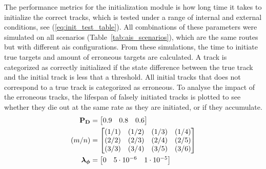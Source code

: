 The performance metrics for the initialization module is how long time it takes to initialize the correct tracks, which is tested under a range of internal and external conditions, see (\ref{eq:init_test_table}). All combinations of these parameters were simulated on all scenarios (Table~\ref{tab:ais_scenarios}), which are the same routes but with different \gls{ais} configurations. 
 From these simulations, the time to initiate true targets and amount of erroneous targets are calculated. A track is categorized as correctly initialized if the state difference between the true track and the initial track is less that a threshold. All initial tracks that does not correspond to a true track is categorized as erroneous. To analyse the impact of the erroneous tracks, the lifespan of falsely initiated tracks is plotted to see whether they die out at the same rate as they are initiated, or if they accumulate.
\begin{equation}\label{eq:init_test_table}
\begin{split}
\boldsymbol{\mathbf{P_D}} &= \begin{bmatrix} 0.9 & 0.8 & 0.6 \end{bmatrix} \\
(m/n) &= \begin{bmatrix} 	(1/1) & (1/2) & (1/3) & (1/4) \\
							(2/2) & (2/3) & (2/4) & (2/5) \\
							(3/3) & (3/4) & (3/5) & (3/6)
		   \end{bmatrix} \\
\boldsymbol{\mathbf{\lambda_\phi}} &= \begin{bmatrix} 0 & 5\cdot10^{-6} & 1\cdot10^{-5}\end{bmatrix}
\end{split}
\end{equation}

